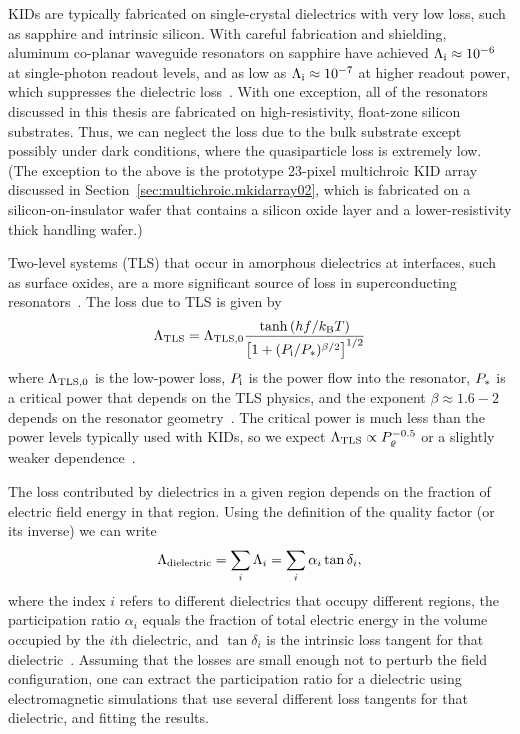 KIDs are typically fabricated on single-crystal dielectrics with very low loss, such as sapphire and intrinsic silicon.
With careful fabrication and shielding, aluminum co-planar waveguide resonators on sapphire have achieved $\Lambda_{\mathrm{i}} \approx \num{e-6}$ at single-photon readout levels, and as low as $\Lambda_{\mathrm{i}} \approx \num{e-7}$ at higher readout power, which suppresses the dielectric loss~\autocite{Megrant2012APL}.
With one exception, all of the resonators discussed in this thesis are fabricated on high-resistivity, float-zone silicon substrates.
Thus, we can neglect the loss due to the bulk substrate except possibly under dark conditions, where the quasiparticle loss is extremely low.
(The exception to the above is the prototype 23-pixel multichroic KID array discussed in Section~\ref{sec:multichroic.mkidarray02}, which is fabricated on a silicon-on-insulator wafer that contains a silicon oxide layer and a lower-resistivity thick handling wafer.)

Two-level systems (TLS) that occur in amorphous dielectrics at interfaces, such as surface oxides, are a more significant source of loss in superconducting resonators~\autocite{Gao2007APL, OConnell2008APL,Gao2008aAPL,Gao2008bAPL,Wang2009APL,Wenner2011APL}.
The loss due to TLS is given by
\begin{equation}
\Lambda_{\mathrm{TLS}}
  =
  \Lambda_{\mathrm{TLS}, 0} \frac{\tanh \left( h f / k_\mathrm{B} T \right)}{\left[1 + (P_{\mathrm{i}} / P_*)^{\beta / 2} \right]^{1/2}}
\end{equation}
where $\Lambda_{\mathrm{TLS}, 0}$ is the low-power loss, $P_{\mathrm{i}}$ is the power flow into the resonator, $P_*$ is a critical power that depends on the TLS physics, and the exponent $\beta \approx 1.6 - 2$ depends on the resonator geometry~\autocite{Wang2009APL}.
The critical power is much less than the power levels typically used with KIDs, so we expect
$\Lambda_{\mathrm{TLS}} \propto P_\varrho^{-0.5}$
or a slightly weaker dependence~\autocite{Zmuidzinas2012ARCMP}.

The loss contributed by dielectrics in a given region depends on the fraction of electric field energy in that region.
Using the definition of the quality factor (or its inverse) we can write
\begin{equation}
\Lambda_\mathrm{dielectric}
  =
  \sum_i
  \Lambda_i
  =
  \sum_i
  \alpha_i \tan \delta_i,
\end{equation}
where the index $i$ refers to different dielectrics that occupy different regions, the participation ratio $\alpha_i$ equals the fraction of total electric energy in the volume occupied by the $i$th dielectric, and $\tan \delta_i$ is the intrinsic loss tangent for that dielectric~\autocite{OConnell2008APL}.
Assuming that the losses are small enough not to perturb the field configuration, one can extract the participation ratio for a dielectric using electromagnetic simulations that use several different loss tangents for that dielectric, and fitting the results.

